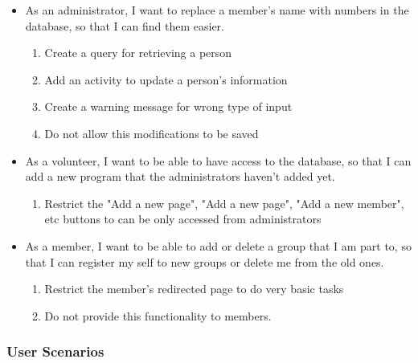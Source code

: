 \documentclass{l3proj}
\begin{document}
\begin{itemize}

\item  As an administrator, I want to replace a member's name with numbers in the database, so that I can find them easier.

	\begin{enumerate}
	
	\item Create a query for retrieving a person
	
	\item Add an activity to update a person's information
	
	\item Create a warning message for wrong type of input
	
	\item Do not allow this modifications to be saved
	\end{enumerate}
	
\item As a volunteer, I want to be able to have access to the database, so that I can add a new program that the administrators haven’t added yet.

	\begin{enumerate}
	\item Restrict the "Add a new page", "Add a new page", "Add a new member", etc buttons to can be only accessed from administrators
	\end{enumerate}
	
\item As a member, I want to be able to add or delete a group that I am part to, so that I can register my self to new groups or delete me from the old ones.

	\begin{enumerate}
	\item Restrict the member's redirected page to do very basic tasks
	\item Do not provide this functionality to members.
	\end{enumerate}

\end{itemize}

\subsubsection{User Scenarios}
\label{user_scenarios}
\end{document}
